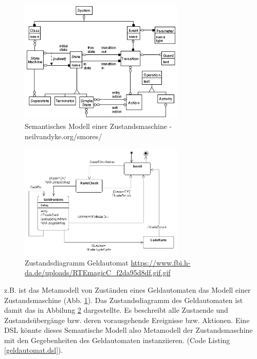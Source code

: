 \documentclass[11pt,english,ngerman, headsepline]{scrreprt}
\begin{document}
\begin{figure}[h!]
	\begin{center}
	\includegraphics[width=0.7\textwidth]{pics/data-model.jpg}
	\end{center}
	\caption{Semantisches Modell einer 	Zustandsmaschine
	- neilvandyke.org/smores/ }
	\label{state-machine-semantic-model}
\end{figure}

\begin{figure}[h!]
	\begin{center}
	\includegraphics[width=0.7\textwidth]{pics/zutandsdiaGeldautomat.jpg}
	\end{center}
	\caption{Zustandsdiagramm Geldautomat
	\url{https://www.fbi.h-da.de/uploads/RTEmagicC_f2da95d8df.gif.gif} }
	\label{zutandsdiaGeldautomat.jpg}
\end{figure}

z.B. ist das Metamodell von Zuständen eines Geldautomaten das Modell einer
Zustandsmaschine (Abb. \ref{state-machine-semantic-model}). Das Zustandsdiagramm
des Geldautomaten ist damit das in Abbilung \ref{zutandsdiaGeldautomat.jpg}
dargestellte. Es beschreibt alle Zustaende und Zustandsübergänge bzw. deren
vorausgehende Ereignisse bzw. Aktionen. Eine DSL könnte dieses Semantische
Modell also Metamodell der Zustandsmaschine mit den Gegebenheiten des
Geldautomaten instanziieren. (Code Listing \ref{geldautomat.dsl}).
   
\end{document}
